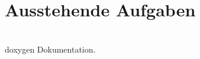 \chapter{Ausstehende Aufgaben }
\hypertarget{todo}{}\label{todo}

\begin{DoxyRefList}
\item[{\parbox[t]{\linewidth}{Datei \doxylink{main_8c}{main.c} }}]\hfill \\
\label{todo__todo000001}%
%
doxygen Dokumentation.
\end{DoxyRefList}